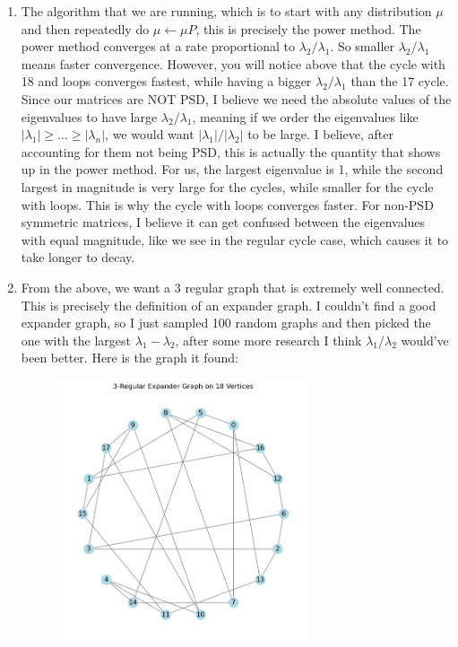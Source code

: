 \documentclass[12pt]{article}
\begin{document}
\begin{enumerate}[label=(\alph*)]
        \item The algorithm that we are running, which is to start with any distribution $\mu$ and then repeatedly do $\mu \leftarrow \mu P$, this is precisely the power method. The power method converges at a rate proportional to $\lambda_2/\lambda_1$. So smaller $\lambda_2/\lambda_1$ means faster convergence. However, you will notice above that the cycle with 18 and loops converges fastest, while having a bigger $\lambda_2/\lambda_1$ than the 17 cycle. Since our matrices are NOT PSD, I believe we need the absolute values of the eigenvalues to have large $\lambda_2/\lambda_1$, meaning if we order the eigenvalues like $|\lambda_1| \geq \ldots \geq |\lambda_n|$, we would want $|\lambda_1|/|\lambda_2|$ to be large. I believe, after accounting for them not being PSD, this is actually the quantity that shows up in the power method. For us, the largest eigenvalue is 1, while the second largest in magnitude is very large for the cycles, while smaller for the cycle with loops. This is why the cycle with loops converges faster. For non-PSD symmetric matrices, I believe it can get confused between the eigenvalues with equal magnitude, like we see in the regular cycle case, which causes it to take longer to decay. 

        \item From the above, we want a 3 regular graph that is extremely well connected. This is precisely the definition of an expander graph. I couldn't find a good expander graph, so I just sampled 100 random graphs and then picked the one with the largest $\lambda_1 - \lambda_2$, after some more research I think $\lambda_1/\lambda_2$ would've been better. Here is the graph it found:
        \begin{figure}[H]
            \centering
            \includegraphics[width=0.7\textwidth]{random_graph.png}
        \end{figure}


\end{enumerate}
\end{document}
